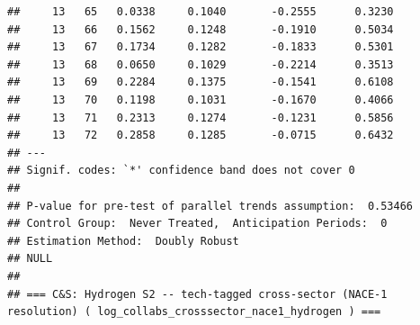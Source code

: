 \documentclass[
]{article}
\begin{document}
\begin{verbatim}
##     13   65   0.0338     0.1040       -0.2555      0.3230  
##     13   66   0.1562     0.1248       -0.1910      0.5034  
##     13   67   0.1734     0.1282       -0.1833      0.5301  
##     13   68   0.0650     0.1029       -0.2214      0.3513  
##     13   69   0.2284     0.1375       -0.1541      0.6108  
##     13   70   0.1198     0.1031       -0.1670      0.4066  
##     13   71   0.2313     0.1274       -0.1231      0.5856  
##     13   72   0.2858     0.1285       -0.0715      0.6432  
## ---
## Signif. codes: `*' confidence band does not cover 0
## 
## P-value for pre-test of parallel trends assumption:  0.53466
## Control Group:  Never Treated,  Anticipation Periods:  0
## Estimation Method:  Doubly Robust
## NULL
## 
## === C&S: Hydrogen S2 -- tech-tagged cross-sector (NACE-1 resolution) ( log_collabs_crosssector_nace1_hydrogen ) ===
\end{verbatim}
\end{document}
